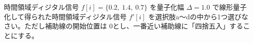 時間領域ディジタル信号 $f[i] = \{0.2,\ 1.4,\ 0.7 \}$ を量子化幅 $\Delta = 1.0$ で線形量子化して得られた時間領域ディジタル信号 $f'[i]$ を選択肢a〜dの中から1つ選びなさい。ただし補助線の開始位置は $0$とし、一番近い補助線に「四捨五入」することにする。
